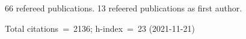66 refereed publications. 13 refeered publications as first author.

Total citations~=~2136; h-index~=~23 (2021-11-21)